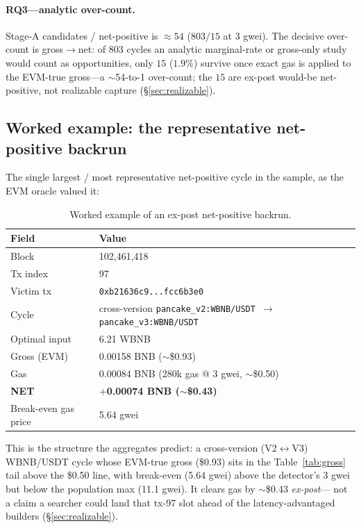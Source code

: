 \documentclass[11pt]{article}
\newcommand{\code}[1]{\texttt{#1}}
\begin{document}
\paragraph{RQ3---analytic over-count.} Stage-A candidates / net-positive is
$\approx 54$ ($803/15$ at 3 gwei). The decisive over-count is gross$\to$net: of
$803$ cycles an analytic marginal-rate or gross-only study would count as
opportunities, only $15$ ($1.9\%$) survive once exact gas is applied to the EVM-true
gross---a $\sim$54-to-1 over-count; the $15$ are ex-post would-be net-positive, not
realizable capture (\S\ref{sec:realizable}).

\subsection{Worked example: the representative net-positive backrun}
The single largest / most representative net-positive cycle in the sample, as the
EVM oracle valued it:
\begin{table}[h]\centering
\caption{Worked example of an ex-post net-positive backrun.}\label{tab:example}
\begin{tabular}{ll}
\toprule
Field & Value \\
\midrule
Block & 102{,}461{,}418 \\
Tx index & 97 \\
Victim tx & \code{0xb21636c9...fcc6b3e0} \\
Cycle & cross-version \code{pancake\_v2:WBNB/USDT $\to$ pancake\_v3:WBNB/USDT} \\
Optimal input & 6.21 WBNB \\
Gross (EVM) & 0.00158 BNB ($\sim$\$0.93) \\
Gas & 0.00084 BNB (280k gas @ 3 gwei, $\sim$\$0.50) \\
\textbf{NET} & \textbf{$+$0.00074 BNB ($\sim$\$0.43)} \\
Break-even gas price & 5.64 gwei \\
\bottomrule
\end{tabular}
\end{table}

\noindent This is the structure the aggregates predict: a cross-version (V2$\leftrightarrow$V3)
WBNB/USDT cycle whose EVM-true gross (\$0.93) sits in the Table~\ref{tab:gross} tail
above the \$0.50 line, with break-even (5.64 gwei) above the detector's 3 gwei but
below the population max (11.1 gwei). It clears gas by $\sim$\$0.43 \emph{ex-post}---
not a claim a searcher could land that tx-97 slot ahead of the latency-advantaged
builders (\S\ref{sec:realizable}).
\end{document}
